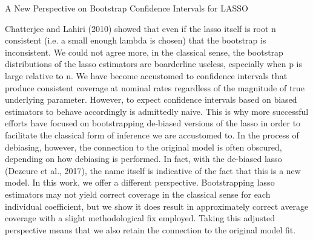A New Perspective on Bootstrap Confidence Intervals for LASSO

Chatterjee and Lahiri (2010) showed that even if the lasso itself is root n consistent (i.e. a small enough lambda is chosen) that the bootstrap is inconsistent. We could not agree more, in the classical sense, the bootstrap distributions of the lasso estimators are boarderline useless, especially when p is large relative to n. We have become accustomed to confidence intervals that produce consistent coverage at nominal rates regardless of the magnitude of true underlying parameter. However, to expect confidence intervals based on biased estimators to behave accordingly is admittedly naive. This is why more successful efforts have focused on bootstrapping de-biased versions of the lasso in order to facilitate the classical form of inference we are accustomed to. In the process of debiasing, however, the connection to the original model is often obscured, depending on how debiasing is performed. In fact, with the de-biased lasso (Dezeure et al., 2017), the name itself is indicative of the fact that this is a new model. In this work, we offer a different perspective. Bootstrapping lasso estimators may not yield correct coverage in the classical sense for each individual coefficient, but we show it does result in approximately correct average coverage with a slight methodological fix employed. Taking this adjusted perspective means that we also retain the connection to the original model fit.